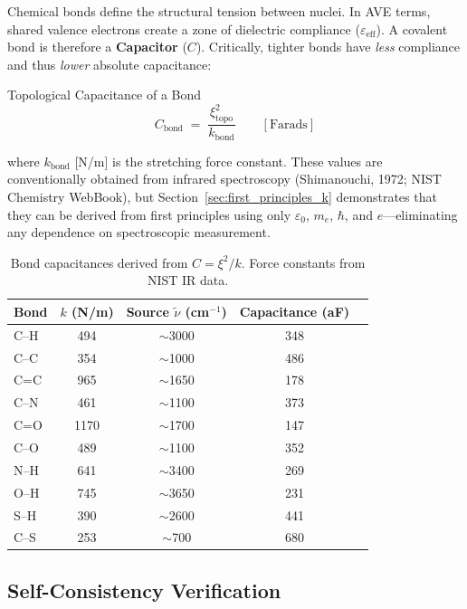 Chemical bonds define the structural tension between nuclei. In AVE terms, shared valence electrons create a zone of dielectric compliance ($\varepsilon_\text{eff}$). A covalent bond is therefore a \textbf{Capacitor} ($C$). Critically, tighter bonds have \emph{less} compliance and thus \emph{lower} absolute capacitance:
\begin{resultbox}{Topological Capacitance of a Bond}
\begin{equation}
    C_\text{bond} \;=\; \frac{\xi^2_\text{topo}}{k_\text{bond}}
    \qquad [\text{Farads}]
    \label{eq:C_bond}
\end{equation}
\end{resultbox}
where $k_\text{bond}$ [N/m] is the stretching force constant. These values are conventionally obtained from infrared spectroscopy (Shimanouchi, 1972; NIST Chemistry WebBook), but Section~\ref{sec:first_principles_k} demonstrates that they can be derived from first principles using only $\varepsilon_0$, $m_e$, $\hbar$, and $e$---eliminating any dependence on spectroscopic measurement.

\begin{table}[h]
\centering
\begin{tabularx}{\textwidth}{@{}lcccX@{}}
\hline
\textbf{Bond} & $k$ \textbf{(N/m)} & \textbf{Source $\tilde{\nu}$ (cm$^{-1}$)} & \textbf{Capacitance (aF)} \\
\hline
C--H  & 494  & $\sim$3000 & 348 \\
C--C  & 354  & $\sim$1000 & 486 \\
C=C   & 965  & $\sim$1650 & 178 \\
C--N  & 461  & $\sim$1100 & 373 \\
C=O   & 1170 & $\sim$1700 & 147 \\
C--O  & 489  & $\sim$1100 & 352 \\
N--H  & 641  & $\sim$3400 & 269 \\
O--H  & 745  & $\sim$3650 & 231 \\
S--H  & 390  & $\sim$2600 & 441 \\
C--S  & 253  & $\sim$700  & 680 \\
\hline
\end{tabularx}
\caption{Bond capacitances derived from $C = \xi^2 / k$. Force constants from NIST IR data.}
\label{tab:capacitances}
\end{table}

\subsection{Self-Consistency Verification}

